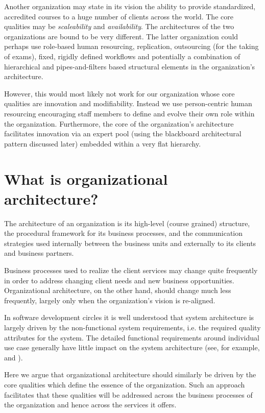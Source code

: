 \documentclass[11pt,english,a4]{article}
\begin{document}
Another organization may state in its vision the ability to provide standardized, accredited courses to a huge number of clients across the world. The core qualities may be {\em{scaleability}} and {\em{availability}}. The architectures of the two organizations are bound to be very different. The latter organization could perhaps use role-based human resourcing, replication, outsourcing (for the taking of exams), fixed, rigidly defined workflows and potentially a combination of hierarchical and pipes-and-filters based structural elements in the organization's architecture.

However, this would most likely not work for our organization whose core qualities are innovation and modifiability. Instead we use person-centric human resourcing encouraging staff members to define and evolve their own role within the organization. Furthermore, the core of the organization's architecture facilitates innovation via an expert pool (using the blackboard architectural pattern discussed later) embedded within a very flat hierarchy.

\section{What is organizational architecture?}

The architecture of an organization is its high-level (course grained) structure, the procedural framework for its business processes, and the communication strategies used internally between the business units and externally to its clients and business partners. 

Business processes used to realize the client services may change quite frequently in order to address changing client needs and new business opportunities. Organizational architecture, on the other hand, should change much less frequently, largely only when the organization's vision is re-aligned.

In software development circles it is well understood that system architecture is largely driven by the non-functional system requirements, i.e. the required quality attributes for the system. The detailed functional requirements around individual use case generally have little impact on the system architecture (see, for example, \cite{Bass-Clements-Kazman-2003} and \cite{Kazman-1994}).

Here we argue that organizational architecture should similarly be driven by the core qualities which define the essence of the organization. Such an approach facilitates that these qualities will be addressed across the business processes of the organization and hence across the services it offers.
\end{document}
